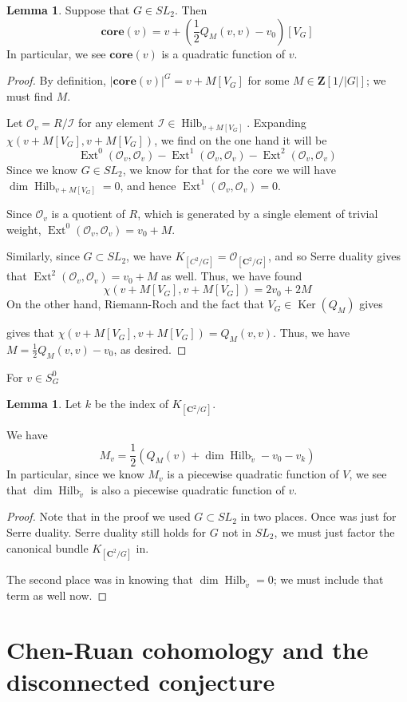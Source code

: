 \documentclass{amsart}[12pt]
\theoremstyle{definition}
\newtheorem{lemma}[dummy]{Lemma}
\newcommand{\Z}{\mathbf{Z}}
\newcommand{\C}{\mathbf{C}}
\newcommand{\OO}{\mathcal{O}}
\newcommand{\core}{\mathbf{core}}
\DeclareMathOperator{\Hilb}{Hilb}
\DeclareMathOperator{\Ext}{Ext}
\DeclareMathOperator{\Ker}{Ker}
\begin{document}
\begin{lemma} Suppose that $G\in SL_2$. Then
$$\core(v)=v+(\frac{1}{2}Q_M(v,v)-v_0)[V_G]$$
In particular, we see $\core(v)$ is a quadratic function of $v$.
\end{lemma}

\begin{proof}
By definition, $|\core(v)|^G=v+M[V_G]$ for some $M\in\Z[1/|G|]$; we must find $M$.

Let $\OO_v=R/\mathcal{I}$ for any element $\mathcal{I}\in\Hilb_{v+M[V_G]}$.  Expanding $\chi(v+M[V_G], v+M[V_G])$, we find on the one hand it will be
$$\Ext^0(\OO_v,\OO_v)-\Ext^1(\OO_v,\OO_v)-\Ext^2(\OO_v,\OO_v)$$
Since we know $G\in SL_2$, we know for that for the core we will have $\dim\Hilb_{v+M[V_G]}=0$, and hence $\Ext^1(\OO_v,\OO_v)=0$.

Since $\OO_v$ is a quotient of $R$, which is generated by a single element of trivial weight, $\Ext^0(\OO_v,\OO_v)=v_0+M$.

Similarly, since $G\subset SL_2$, we have $K_{[C^2/G]}=\OO_{[\C^2/G]}$, and so Serre duality gives that $\Ext^2(\OO_v,\OO_v)=v_0+M$ as well.  Thus, we have found
$$\chi(v+M[V_G],v+M[V_G])=2v_0+2M$$
On the other hand, Riemann-Roch and the fact that $V_G\in\Ker(Q_{M})$ gives

gives that $\chi(v+M[V_G],v+M[V_G])=Q_M(v,v)$.  Thus, we have $M=\frac{1}{2}Q_M(v,v)-v_0$, as desired.
\end{proof}

For $v\in S^0_G$

\begin{lemma}
Let $k$ be the index of $K_{[\C^2/G]}$.

We have
$$M_v=\frac{1}{2}\left(Q_M(v)+\dim\Hilb_{\tilde{v}} -v_0-v_k\right)$$
In particular, since we know $M_v$ is a piecewise quadratic function of $V$, we see that $\dim\Hilb_{\tilde{v}}$ is also a piecewise quadratic function of $v$.

\end{lemma}

\begin{proof}
Note that in the proof we used $G\subset SL_2$ in two places.  Once was just for Serre duality.  Serre duality still holds for $G$ not in $SL_2$, we must just factor the canonical bundle $K_{[\C^2/G]}$ in.

The second place was in knowing that $\dim \Hilb_{\tilde{v}}=0$; we must include that term as well now.

\end{proof}
\section{Chen-Ruan cohomology and the disconnected conjecture}
\end{document}
